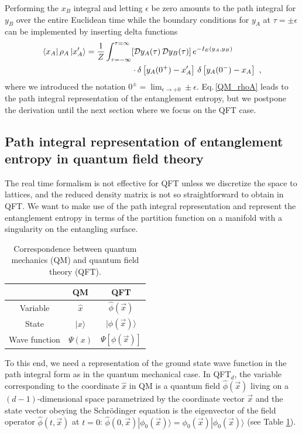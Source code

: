 Performing the $x_B$ integral and letting $\epsilon$ be zero amounts to the path integral for $y_B$ over the entire Euclidean time while the boundary conditions for $y_A$ at $\tau = \pm \epsilon$ can be implemented by inserting delta functions
\begin{align}\label{QM_rhoA}
\begin{aligned}
	\langle x_A| \,\rho_A\, |x_A' \rangle = \frac{1}{Z} \int^{\tau=\infty}_{\tau=-\infty} &[{\cal D} y_A(\tau)\,{\cal D} y_B(\tau)]\,e^{- I_E (y_A, y_B)}\\
	&\cdot \delta \left[ y_A(0^+) - x_A'\right]\,\delta \left[ y_A(0^-) - x_A\right]\ , 
\end{aligned}
\end{align}
where we introduced the notation $0^\pm =\lim_{\epsilon\to +0}\pm\epsilon$.
Eq.\,\eqref{QM_rhoA} leads to the path integral representation of the entanglement entropy, but we postpone the derivation until the next section where we focus on the QFT case.



\subsection{Path integral representation of entanglement entropy in quantum field theory}
The real time formalism is not effective for QFT unless we discretize the space to lattices, and the reduced density matrix is not so straightforward to obtain in QFT.
We want to make use of the path integral representation and represent the entanglement entropy in terms of the partition function on a manifold with a singularity on the entangling surface.

\begin{table}[htbp]
\caption{\label{tab:QM_QFT}Correspondence between quantum mechanics (QM) and quantum field theory (QFT).}
\begin{ruledtabular}
\begin{tabular}{ccc}
  & QM & QFT\\ \hline
 Variable & $\hat x$ & $\hat \phi(\vec x)$\\
 State & $|x\rangle$ & $|\phi (\vec x)\rangle$ \\
 Wave function & $\Psi(x)$ & $\Psi[ \phi(\vec x) ]$
\end{tabular}
\end{ruledtabular}
\end{table}

To this end, we need a representation of the ground state wave function in the path integral form as in the quantum mechanical case.
In QFT$_d$, the variable corresponding to the coordinate $\hat x$ in QM is a quantum field $\hat\phi(\vec x)$ living on a $(d-1)$-dimensional space parametrized by the coordinate vector $\vec x$ and the state vector obeying the Schr{\"o}dinger equation is the eigenvector of the field operator $\hat \phi (t,\vec{x})$ at $t=0$: $\hat \phi (0,\vec{x}) |\phi_0(\vec{x}) \rangle = \phi_0(\vec{x})|\phi_0(\vec{x}) \rangle$ (see Table \ref{tab:QM_QFT}).


